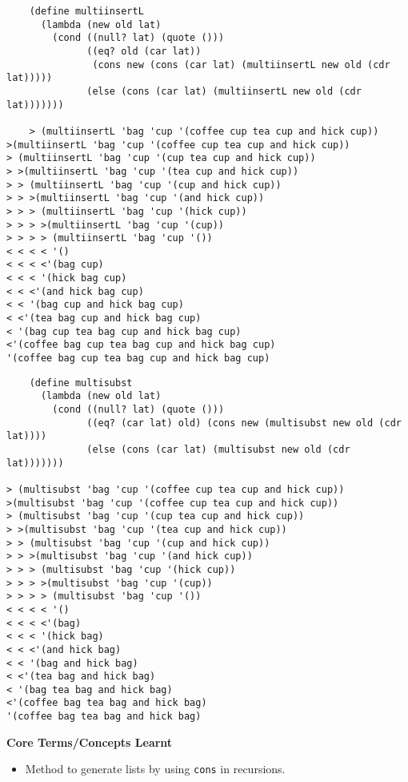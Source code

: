 \documentclass[11pt]{article}
\begin{document}
\begin{itemize}
\begin{verbatim}
    (define multiinsertL
      (lambda (new old lat)
        (cond ((null? lat) (quote ()))
              ((eq? old (car lat))
               (cons new (cons (car lat) (multiinsertL new old (cdr lat)))))
              (else (cons (car lat) (multiinsertL new old (cdr lat)))))))

    > (multiinsertL 'bag 'cup '(coffee cup tea cup and hick cup))
>(multiinsertL 'bag 'cup '(coffee cup tea cup and hick cup))
> (multiinsertL 'bag 'cup '(cup tea cup and hick cup))
> >(multiinsertL 'bag 'cup '(tea cup and hick cup))
> > (multiinsertL 'bag 'cup '(cup and hick cup))
> > >(multiinsertL 'bag 'cup '(and hick cup))
> > > (multiinsertL 'bag 'cup '(hick cup))
> > > >(multiinsertL 'bag 'cup '(cup))
> > > > (multiinsertL 'bag 'cup '())
< < < < '()
< < < <'(bag cup)
< < < '(hick bag cup)
< < <'(and hick bag cup)
< < '(bag cup and hick bag cup)
< <'(tea bag cup and hick bag cup)
< '(bag cup tea bag cup and hick bag cup)
<'(coffee bag cup tea bag cup and hick bag cup)
'(coffee bag cup tea bag cup and hick bag cup)

\end{verbatim}

\begin{verbatim}
    (define multisubst
      (lambda (new old lat)
        (cond ((null? lat) (quote ()))
              ((eq? (car lat) old) (cons new (multisubst new old (cdr lat))))
              (else (cons (car lat) (multisubst new old (cdr lat)))))))

> (multisubst 'bag 'cup '(coffee cup tea cup and hick cup))
>(multisubst 'bag 'cup '(coffee cup tea cup and hick cup))
> (multisubst 'bag 'cup '(cup tea cup and hick cup))
> >(multisubst 'bag 'cup '(tea cup and hick cup))
> > (multisubst 'bag 'cup '(cup and hick cup))
> > >(multisubst 'bag 'cup '(and hick cup))
> > > (multisubst 'bag 'cup '(hick cup))
> > > >(multisubst 'bag 'cup '(cup))
> > > > (multisubst 'bag 'cup '())
< < < < '()
< < < <'(bag)
< < < '(hick bag)
< < <'(and hick bag)
< < '(bag and hick bag)
< <'(tea bag and hick bag)
< '(bag tea bag and hick bag)
<'(coffee bag tea bag and hick bag)
'(coffee bag tea bag and hick bag)

\end{verbatim}
\end{itemize}

\textbf{Core Terms/Concepts Learnt}
\begin{itemize}
\item Method to generate lists by using \texttt{cons} in recursions.
\end{itemize}
\end{document}
